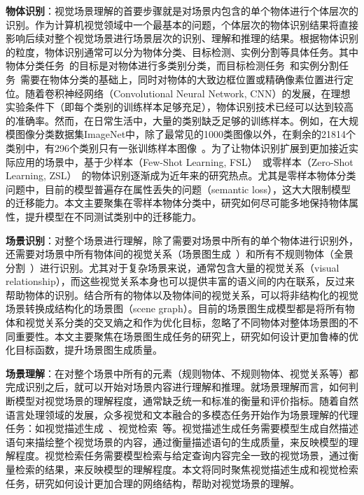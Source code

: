 \begin{asparaenum}
\item \textbf{物体识别}：视觉场景理解的首要步骤就是对场景内包含的单个物体进行个体层次的识别。作为计算机视觉领域中一个最基本的问题，个体层次的物体识别结果将直接影响后续对整个视觉场景进行场景层次的识别、理解和推理的结果。根据物体识别的粒度，物体识别通常可以分为物体分类、目标检测、实例分割等具体任务。其中物体分类任务~\cite{russakovsky2015imagenet}的目标是对物体进行多类别分类，而目标检测任务~\cite{ren2015faster,liu2016ssd,redmon2016you}和实例分割任务~\cite{he2017mask}需要在物体分类的基础上，同时对物体的大致边框位置或精确像素位置进行定位。随着卷积神经网络（Convolutional Neural Network, CNN）的发展，在理想实验条件下（即每个类别的训练样本足够充足），物体识别技术已经可以达到较高的准确率。然而，在日常生活中，大量的类别缺乏足够的训练样本。例如，在大规模图像分类数据集ImageNet中，除了最常见的1000类图像以外，在剩余的21814个类别中，有296个类别只有一张训练样本图像~\cite{russakovsky2015imagenet}。为了让物体识别扩展到更加接近实际应用的场景中，基于少样本（Few-Shot Learning, FSL）~\cite{fei2006one}或零样本（Zero-Shot Learning, ZSL）~\cite{lampert2009learning}的物体识别逐渐成为近年来的研究热点。尤其是零样本物体分类问题中，目前的模型普遍存在属性丢失的问题（semantic loss），这大大限制模型的迁移能力。本文主要聚集在零样本物体分类中，研究如何尽可能多地保持物体属性，提升模型在不同测试类别中的迁移能力。

\item \textbf{场景识别}：对整个场景进行理解，除了需要对场景中所有的单个物体进行识别外，还需要对场景中所有物体间的视觉关系（场景图生成~\cite{johnson2015image}）和所有不规则物体（全景分割~\cite{kirillov2019panoptic}）进行识别。尤其对于复杂场景来说，通常包含大量的视觉关系（visual relationship），而这些视觉关系本身也可以提供丰富的语义间的内在联系，反过来帮助物体的识别。结合所有的物体以及物体间的视觉关系，可以将非结构化的视觉场景转换成结构化的场景图（scene graph）。目前的场景图生成模型都是将所有物体和视觉关系分类的交叉熵之和作为优化目标，忽略了不同物体对整体场景图的不同重要性。本文主要聚焦在场景图生成任务的研究上，研究如何设计更加鲁棒的优化目标函数，提升场景图生成质量。

\item \textbf{场景理解}：在对整个场景中所有的元素（规则物体、不规则物体、视觉关系等）都完成识别之后，就可以开始对场景内容进行理解和推理。就场景理解而言，如何判断模型对视觉场景的理解程度，通常缺乏统一和标准的衡量和评价指标。随着自然语言处理领域的发展，众多视觉和文本融合的多模态任务开始作为场景理解的代理任务：如视觉描述生成~\cite{vinyals2015show}、视觉检索~\cite{gao2017tall}等。视觉描述生成任务需要模型生成自然描述语句来描绘整个视觉场景的内容，通过衡量描述语句的生成质量，来反映模型的理解程度。视觉检索任务需要模型检索与给定查询内容完全一致的视觉场景，通过衡量检索的结果，来反映模型的理解程度。本文将同时聚焦视觉描述生成和视觉检索任务，研究如何设计更加合理的网络结构，帮助对视觉场景的理解。


\end{asparaenum}

